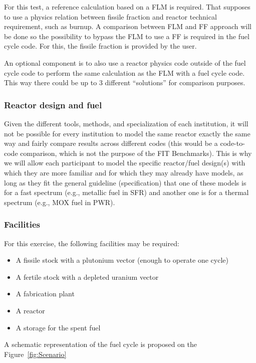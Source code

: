 \documentclass[review]{elsarticle}
\begin{document}
For this test, a reference calculation based on a FLM is required. That supposes to use a physics relation between fissile fraction and reactor technical requirement, such as burnup. A comparison between FLM and FF approach will be done so the possibility to bypass the FLM to use a FF is required in the fuel cycle code. For this, the fissile fraction is provided by the user. 

An optional component is to also use a reactor physics code outside of the fuel cycle code to perform the same calculation as the FLM with a fuel cycle code. This way there could be up to 3 different “solutions” for comparison purposes.

\subsubsection{Reactor design and fuel}

Given the different tools, methods, and specialization of each institution, it will not be possible for every institution to model the same reactor exactly the same way and fairly compare results across different codes (this would be a code-to-code comparison, which is not the purpose of the FIT Benchmarks). This is why we will allow each participant to model the specific reactor/fuel design(s) with which they are more familiar and for which they may already have models, as long as they fit the general guideline (specification) that one of these models is for a fast spectrum (e.g., metallic fuel in SFR) and another one is for a thermal spectrum (e.g., MOX fuel in PWR).

\subsubsection{Facilities}

For this exercise, the following facilities may be required: 

\begin{itemize}
    \item A fissile stock with a plutonium vector (enough to operate one cycle)
    \item A fertile stock with a depleted uranium vector
    \item A fabrication plant
    \item A reactor
    \item A storage for the spent fuel
\end{itemize}

A schematic representation of the fuel cycle is proposed on the Figure~\ref{fig:Scenario}
\end{document}
